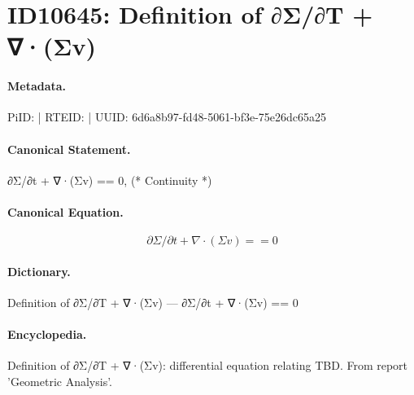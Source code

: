 \section*{ID10645: Definition of ∂Σ/∂T + ∇·(Σv)}
\paragraph{Metadata.}
PiID:  | RTEID:  | UUID: 6d6a8b97-fd48-5061-bf3e-75e26dc65a25

\paragraph{Canonical Statement.}
∂Σ/∂t + ∇·(Σv) == 0, (* Continuity *)

\paragraph{Canonical Equation.}
\[
∂Σ/∂t + ∇·(Σv) == 0
\]

\paragraph{Dictionary.}
Definition of ∂Σ/∂T + ∇·(Σv) — ∂Σ/∂t + ∇·(Σv) == 0

\paragraph{Encyclopedia.}
Definition of ∂Σ/∂T + ∇·(Σv): differential equation relating TBD. From report 'Geometric Analysis'.
